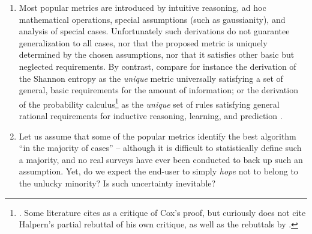 \documentclass[\ifafour a4paper,12pt,\else a5paper,10pt,\fi%
onecolumn,oneside,article,%
british%
]{memoir}
\theoremstyle{remark}
\theoremstyle{innote}
\renewcommand*{\|}[1][]{\nonscript\:#1\vert\nonscript\:\mathopen{}}
\newcommand*{\sect}{\S}%
\newcommand*{\chap}{ch.}%
\newcommand*{\chaps}{chs}%
\begin{document}
\begin{enumerate}
\item\label{item:ad_hoc} Most popular metrics are introduced by intuitive reasoning, ad hoc mathematical operations, special assumptions (such as gaussianity\autocites[e.g.][\sect~31 p.~183 for the Matthews correlation coefficient]{fisher1925_r1963}), and analysis of special cases. Unfortunately such derivations do not guarantee generalization to all cases, nor that the proposed metric is uniquely determined by the chosen assumptions, nor that it satisfies other basic but neglected requirements. By contrast, compare for instance the derivation of the Shannon entropy \autocites{shannon1948}[\sect~3.2]{woodward1953_r1964}[also][]{goodetal1968} as the \emph{unique} metric universally satisfying a set of general, basic requirements for the amount of information; or the derivation of the probability calculus\footnote{\cites{cox1946,fine1973}[\chaps~1--2]{jaynes1994_r2003}. Some literature cites \cite{halpern1999} as a critique of Cox's proof, but curiously does not cite Halpern's \cite*{halpern1999b} partial rebuttal of his own critique, as well as the rebuttals by \cite{snow1998,snow2001}.} as the \emph{unique} set of rules satisfying general rational requirements for inductive reasoning, learning, and prediction \autocites{selfetal1987,cheeseman1988}[\chap~12]{russelletal1995_r2022}.
  
\item\label{item:hope_medical} Let us assume that some of the popular metrics identify the best algorithm \enquote{in the majority of cases} -- although it is difficult to statistically define such a majority, and no real surveys have ever been conducted to back up such an assumption. Yet, do we expect the end-user to simply \emph{hope} not to belong to the unlucky minority? Is such uncertainty inevitable?


\end{enumerate}
\end{document}
